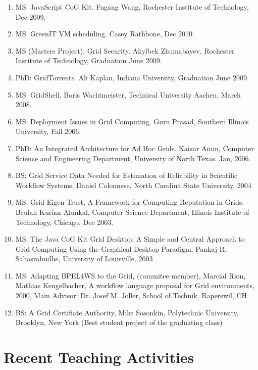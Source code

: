 \documentclass{article}
\begin{document}
\begin{enumerate}
\item  MS: JavaScript CoG Kit. Fugang Wang, Rochester Institute of Technology, Dec 2009. 
\item  MS: GreenIT VM scheduling. Casey Rathbone, Dec 2010. 
\item  MS (Masters Project): Grid Security. Akylbek Zhumabayev, Rochester Institute of Technology, Graduation June 2009. 
\item  PhD: GridTorrents. Ali Kaplan, Indiana University, Graduation June 2009. 
\item  MS: GridShell, Boris Wachtmeister, Technical University Aachen, March 2008.
\item  MS: Deployment Issues in Grid Computing. Guru Prasad, Southern Illinois University, Fall 2006. 
\item  PhD: An Integrated Architecture for Ad Hoc Grids. Kaizar Amin, Computer Science and Engineering Department, University of North Texas. Jan, 2006. 
\item  BS: Grid Service Data Needed for Estimation of Reliability in Scientific Workflow Systems, Daniel Colonnese, North Carolina State University, 2004 
\item  MS: Grid Eigen Trust, A Framework for Computing Reputation in Grids. Beulah Kurian Alunkal, Computer Science Department, Illinois Institute of Technology, Chicago. Dec 2003. 
\item  MS: The Java CoG Kit Grid Desktop, A Simple and Central Approach to Grid Computing Using the Graphical Desktop Paradigm, Pankaj R. Sahasrabudhe, University of Louisville, 2003  
\item  MS: Adapting BPEL4WS to the Grid, (commitee member), Marcial Rion, Mathias Kengelbacher, A workflow language proposal for Grid environments, 2000, Main Advisor: Dr. Josef M. Joller, School of Technik, Raperswil, CH 
\item  BS: A Grid Certifiate Authority, Mike Sosonkin, Polytechnic University, Brooklyn, New York (Best student project of the graduating class)
\end{enumerate}

\section{Recent Teaching Activities}
\end{document}
